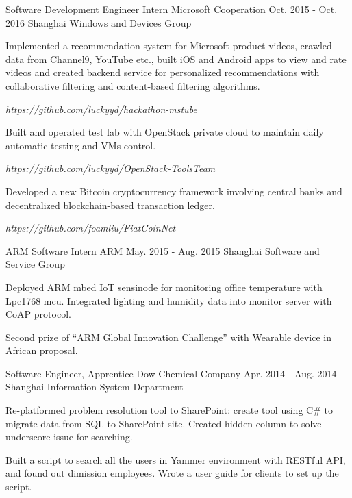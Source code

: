 \begin{cventries}
  \cventry
    {Software Development Engineer Intern}
    {Microsoft Cooperation}
    {Oct. 2015 - Oct. 2016}
    {Shanghai}
    {Windows and Devices Group}
    {
      \begin{cvitems}
        \item {Implemented a recommendation system for Microsoft product videos, crawled data from Channel9, YouTube etc., built iOS and Android apps to view and rate videos and created backend service for personalized recommendations with collaborative filtering and content-based filtering algorithms.}
        \item {\color{red} \emph {https://github.com/luckyyd/hackathon-mstube}}
        \item {Built and operated test lab with OpenStack private cloud to maintain daily automatic testing and VMs control.}
        \item {\color{red} \emph {https://github.com/luckyyd/OpenStack-ToolsTeam}}
        \item {Developed a new Bitcoin cryptocurrency framework involving central banks and decentralized blockchain-based transaction ledger.}
        \item {\color{red} \emph {https://github.com/foamliu/FiatCoinNet}}
      \end{cvitems}
    }
  \cventry
    {ARM Software Intern}
    {ARM}
    {May. 2015 - Aug. 2015}
    {Shanghai}
    {Software and Service Group}
    {
      \begin{cvitems}
        \item {Deployed ARM mbed IoT sensinode for monitoring office temperature with Lpc1768 mcu. Integrated lighting and humidity data into monitor server with CoAP protocol.}
        \item {Second prize of “ARM Global Innovation Challenge” with Wearable device in African proposal.}
      \end{cvitems}
    }
  \cventry
    {Software Engineer, Apprentice}
    {Dow Chemical Company}
    {Apr. 2014 - Aug. 2014}
    {Shanghai}
    {Information System Department}
    {
      \begin{cvitems}
        \item {Re-platformed problem resolution tool to SharePoint: create tool using C\# to migrate data from SQL to SharePoint site. Created hidden column to solve underscore issue for searching.}
        \item {Built a script to search all the users in Yammer environment with RESTful API, and found out dimission employees. Wrote a user guide for clients to set up the script.}
      \end{cvitems} 
    }
\end{cventries}
